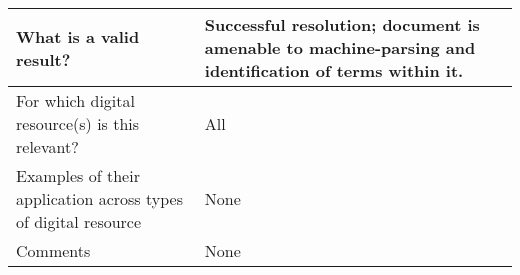 \documentclass[english]{article}
\begin{document}
\begin{longtable}{|p{5cm}|p{9cm}|}
\\



\hline
What is a valid result? &  



Successful resolution; document is amenable to machine-parsing and identification of terms within it.



\\



\hline
For which digital resource(s) is this relevant? &  All\\



\hline
Examples of their application across types of digital resource &  None

\\



\hline

Comments &  None 

\\
\hline

\end{longtable}


\newpage
\end{document}
